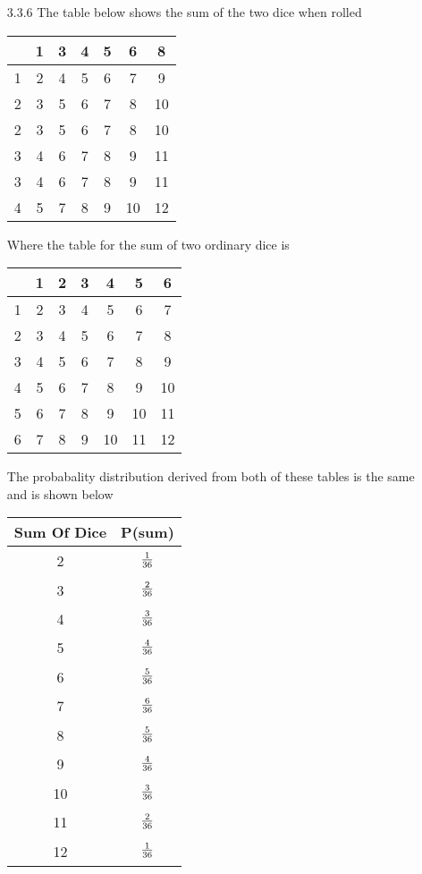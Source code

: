 \documentclass[11pt,fleqn]{article}
\begin{document}
\begin{enumerate}
\item[3.3.6]
The table below shows the sum of the two dice when rolled 

\begin{tabular}{c | c c c c c c |}
 & 1 & 3 & 4  & 5 & 6 & 8 \\
 \hline
 1 & 2 & 4 & 5 & 6 & 7 & 9 \\
 2 & 3 & 5 & 6 & 7 & 8 & 10 \\
 2 & 3 & 5 & 6 & 7 & 8 & 10 \\
 3 & 4 & 6 & 7 & 8 & 9 & 11 \\
 3 & 4 & 6 & 7 & 8 & 9 & 11 \\
 4 & 5 & 7 & 8 & 9 & 10 & 12 \\
 \hline
\end{tabular}

Where the table for the sum of two ordinary dice is 

\begin{tabular}{c | c c c c c c |}
 & 1 & 2 & 3  & 4 & 5 & 6 \\
 \hline
 1 & 2 & 3 & 4 & 5 & 6 & 7 \\
 2 & 3 & 4 & 5 & 6 & 7 & 8 \\
 3 & 4 & 5 & 6 & 7 & 8 & 9 \\
 4 & 5 & 6 & 7 & 8 & 9 & 10 \\
 5 & 6 & 7 & 8 & 9 & 10 & 11 \\
 6 & 7 & 8 & 9 & 10 & 11 & 12 \\
 \hline
\end{tabular}


The probabality distribution derived from both of these tables is the same
and is shown below

\begin{tabular} {c c}
Sum Of Dice & P(sum) \\
\hline
2 & $\tabfrac{1}{36}$ \\
3 & $\tabfrac{2}{36}$ \\
4 & $\tabfrac{3}{36}$ \\
5 & $\tabfrac{4}{36}$ \\
6 & $\tabfrac{5}{36}$ \\
7 & $\tabfrac{6}{36}$ \\
8 & $\tabfrac{5}{36}$ \\
9 & $\tabfrac{4}{36}$ \\
10 &$ \tabfrac{3}{36}$ \\
11 &$ \tabfrac{2}{36}$ \\
12 &$ \tabfrac{1}{36}$ \\
\end{tabular}


\end{enumerate}
\end{document}
